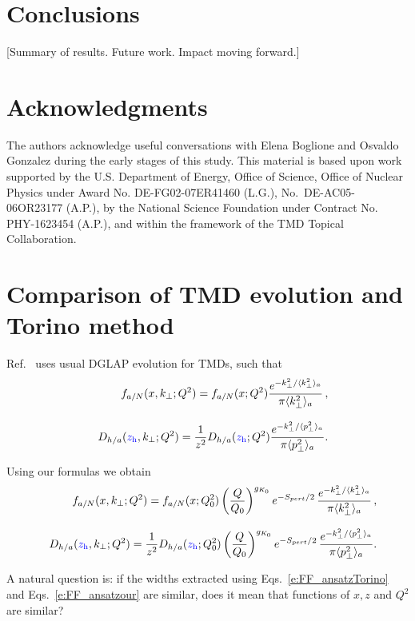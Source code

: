 \documentclass[final,3p,times,onecolumn,sort&compress,hidelinks]{elsarticle}
\newcommand{\zh}{\ensuremath{{\cbl z_{\rm h}}}}
\newcommand\3[1]{\boldsymbol{#1}}
\newcommand{\cbl}{\color{blue}}
\begin{document}
\section{Conclusions}
\label{s:concl}
[Summary of results.  Future work.  Impact moving forward.]



 
\section*{Acknowledgments}
The authors acknowledge useful conversations with Elena Boglione and Osvaldo Gonzalez during the early stages of this study.
 This material is based upon work supported by the
U.S. Department of Energy, Office of Science, Office of Nuclear
Physics under Award No. DE-FG02-07ER41460 (L.G.), No.~DE-AC05-06OR23177 (A.P.), by the National Science Foundation 
under Contract No. PHY-1623454 (A.P.), and within the 
framework of the TMD Topical Collaboration.


\appendix
\section{Comparison of TMD evolution and Torino method}
\label{appendix}

Ref.~\cite{Anselmino:2013lza} uses usual DGLAP evolution for TMDs, such that
\begin{eqnarray}
&&f_{a/N} (x,k_\perp; Q^2)= f_{a/N} (x; Q^2) \frac{e^{-k_\perp^2/{\langle k_\perp^2 \rangle_a}}}{\pi \langle k_\perp^2 \rangle_a}\,,
\nonumber \\[0.3cm]
&&D_{h/a}(\zh,k_\perp; Q^2) =  \frac{1}{z^2} D_{h/a}(\zh; Q^2) \frac{e^{-k_\perp^2/{\langle p_\perp^2 \rangle_a}}}{\pi \langle p_\perp^2 \rangle_a}.
\label{e:FF_ansatzTorino}
\end{eqnarray}

Using our formulas we obtain
\begin{eqnarray}
&&f_{a/N} (x,k_\perp; Q^2)= f_{a/N} (x; Q_0^2) \left( \frac{Q}{Q_0}\right)^{g_{K_0}}e^{-S_{pert}/2}\,\frac{e^{-k_\perp^2/{\langle k_\perp^2 \rangle_a}}} {\pi \langle k_\perp^2 \rangle_a}\, ,
\nonumber \\[0.3cm]
&&D_{h/a}(\zh,k_\perp; Q^2) =  \frac{1}{z^2} D_{h/a}(\zh; Q_0^2)  \left( \frac{Q}{Q_0}\right)^{g_{K_0}}e^{-S_{pert}/2}\,  \frac{e^{-k_\perp^2/{\langle p_\perp^2 \rangle_a}}}{\pi \langle p_\perp^2 \rangle_a}.
\label{e:FF_ansatzour}
\end{eqnarray}

A natural question is: if the widths extracted using Eqs.~\eqref{e:FF_ansatzTorino} and Eqs.~\eqref{e:FF_ansatzour} are similar, does it mean that functions of $x,z$ and $Q^2$ are similar?
\end{document}
